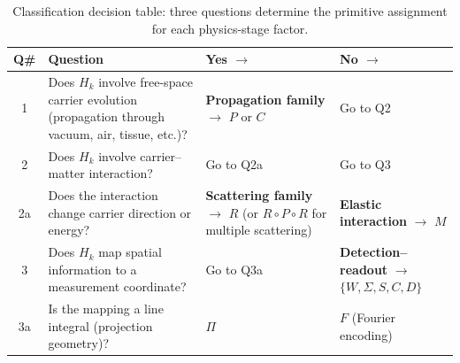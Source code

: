 \begin{table}[htbp]
\centering
\caption{Classification decision table: three questions determine the primitive assignment for each physics-stage factor.} \label{tab:supp_decision}
\begin{tabular}{c p{5.5cm} p{2.8cm} p{3.5cm}}
\toprule
\textbf{Q\#} & \textbf{Question} & \textbf{Yes $\to$} & \textbf{No $\to$} \\
\midrule
1 & Does $H_k$ involve free-space carrier evolution (propagation through vacuum, air, tissue, etc.)? & \textbf{Propagation family} $\to$ $P$ or $C$ & Go to Q2 \\
\midrule
2 & Does $H_k$ involve carrier--matter interaction? & Go to Q2a & Go to Q3 \\
2a & Does the interaction change carrier direction or energy? & \textbf{Scattering family} $\to$ $R$ (or $R \circ P \circ R$ for multiple scattering) & \textbf{Elastic interaction} $\to$ $M$ \\
\midrule
3 & Does $H_k$ map spatial information to a measurement coordinate? & Go to Q3a & \textbf{Detection--readout} $\to$ $\{W, \Sigma, S, C, D\}$ \\
3a & Is the mapping a line integral (projection geometry)? & $\Pi$ & $F$ (Fourier encoding) \\
\bottomrule
\end{tabular}
\end{table}

